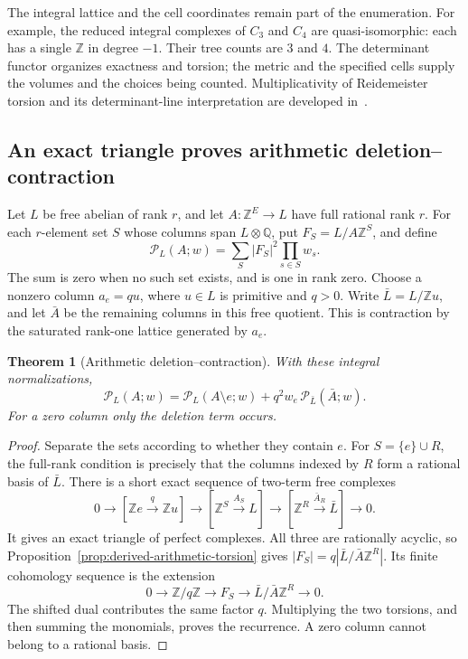 \documentclass[11pt]{article}
\newtheorem{theorem}{Theorem}[section]
\theoremstyle{definition}
\theoremstyle{remark}
\newcommand{\Q}{\mathbb Q}
\newcommand{\Z}{\mathbb Z}
\begin{document}
The integral lattice and the cell coordinates remain part of the
enumeration. For example, the reduced integral complexes of \(C_3\)
and \(C_4\) are quasi-isomorphic: each has a single \(\Z\) in degree
\(-1\). Their tree counts are \(3\) and \(4\). The determinant functor
organizes exactness and torsion; the metric and the specified cells
supply the volumes and the choices being counted. Multiplicativity of
Reidemeister torsion and its determinant-line interpretation are
developed in~\cite{derived-mnev-torsions}.

\subsection{An exact triangle proves arithmetic deletion--contraction}
\label{sec:derived-arithmetic-contraction}

Let \(L\) be free abelian of rank \(r\), and let
\(A:\Z^E\to L\) have full rational rank \(r\).
For each \(r\)-element set \(S\) whose columns span \(L\otimes\Q\), put
\(F_S=L/A\Z^S\), and define
\[
 \mathcal P_L(A;w)=\sum_S |F_S|^2\prod_{s\in S}w_s.
\]
The sum is zero when no such set exists, and is one in rank zero.
Choose a nonzero column \(a_e=q u\), where \(u\in L\) is primitive and
\(q>0\). Write \(\bar L=L/\Z u\), and let \(\bar A\) be the remaining
columns in this free quotient. This is contraction by the saturated
rank-one lattice generated by \(a_e\).

\begin{theorem}[Arithmetic deletion--contraction]
\label{thm:derived-arithmetic-contraction}
With these integral normalizations,
\begin{equation}\label{eq:derived-arithmetic-contraction}
 \mathcal P_L(A;w)=
 \mathcal P_L(A\setminus e;w)
       +q^2w_e\,\mathcal P_{\bar L}(\bar A;w).
\end{equation}
For a zero column only the deletion term occurs.
\end{theorem}
\begin{proof}
Separate the sets according to whether they contain \(e\). For
\(S=\{e\}\cup R\), the full-rank condition is precisely that the
columns indexed by \(R\) form a rational basis of \(\bar L\).
There is a short exact sequence of two-term free complexes
\[
 0\longrightarrow[\Z e\xrightarrow{q}\Z u]
 \longrightarrow[\Z^S\xrightarrow{A_S}L]
 \longrightarrow[\Z^R\xrightarrow{\bar A_R}\bar L]
 \longrightarrow0.
\]
It gives an exact triangle of perfect complexes. All three are
rationally acyclic, so Proposition~\ref{prop:derived-arithmetic-torsion}
gives \(|F_S|=q|\bar L/\bar A\Z^R|\). Its finite cohomology sequence is
the extension
\[
 0\longrightarrow\Z/q\Z\longrightarrow F_S
 \longrightarrow\bar L/\bar A\Z^R\longrightarrow0.
\]
The shifted dual contributes the same factor \(q\). Multiplying the
two torsions, and then summing the monomials, proves the recurrence.
A zero column cannot belong to a rational basis.
\end{proof}
\end{document}

